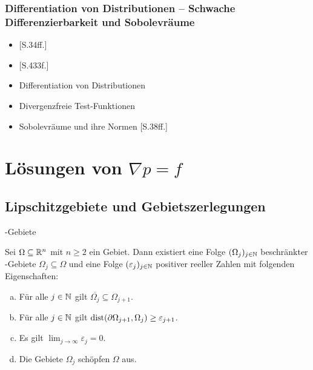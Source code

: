\subsection{Differentiation von Distributionen -- Schwache Differenzierbarkeit und Sobolevräume}

\begin{itemize}
  \item \cite{sohr2001navier}[S.34ff.]
  \item \cite{werner2011fa}[S.433f.]
  \item Differentiation von Distributionen
  \item Divergenzfreie Test-Funktionen
  \item Sobolevräume und ihre Normen \cite{sohr2001navier}[S.38ff.]
\end{itemize}

\chapter{Lösungen von $\nabla p = f$}
\section{Lipschitzgebiete und Gebietszerlegungen}

\begin{defn}
  \lipschitz\hyp{}Gebiete  
\end{defn}

\begin{lem}
  \label{lem:lipschitzExhaust}
  Sei $\Omega \subseteq \mathbb{R}^n$ mit $n \geq 2$ ein Gebiet.
  Dann existiert eine Folge $(\Omega_j)_{j \in \mathbb{N}}$ beschränkter \lipschitz\hyp{}Gebiete $\Omega_j \subseteq \Omega$ und eine Folge $(\varepsilon_j)_{j \in \mathbb{N}}$ positiver reeller Zahlen mit folgenden Eigenschaften:
  \begin{enumerate}[a)]
    \item Für alle $j \in \mathbb{N}$ gilt $\overline{\Omega_j} \subseteq \Omega_{j + 1}$.
    \item Für alle $j \in \mathbb{N}$ gilt $\operatorname{dist}( \partial \Omega_{j + 1}, \Omega_j) \geq \varepsilon_{j + 1}$. 
    \item Es gilt $\lim_{j \to \infty} \varepsilon_j = 0$.
    \item Die Gebiete $\Omega_j$ schöpfen $\Omega$ aus.
  \end{enumerate}
\end{lem}


